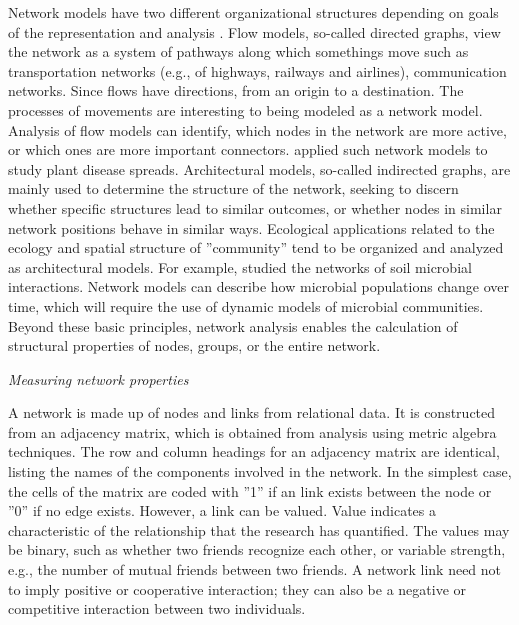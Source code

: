 Network models have two different organizational structures depending on goals of the representation and analysis . Flow models, so-called directed graphs, view the network as a system of pathways along which somethings move such as transportation networks (e.g., of highways, railways and airlines), communication networks. Since flows have directions, from an origin to a destination. The processes of movements  are interesting to being modeled as a network model. Analysis of flow models can identify, which nodes in the network are more active, or which ones are more important connectors.  applied such network models to study plant disease spreads. Architectural models, so-called indirected graphs, are mainly used to determine the structure of the network, seeking to discern whether specific structures lead to similar outcomes, or whether nodes in similar network positions behave in similar ways. Ecological applications related to the ecology and spatial structure of ''community'' tend to be organized and analyzed as architectural models. For example,  studied the networks of soil microbial interactions. Network models can describe how microbial populations change over time, which will require the use of dynamic models of microbial communities. Beyond these basic principles, network analysis enables the calculation of structural properties of nodes, groups, or the entire network.

\textit{Measuring network properties}

A network is made up of nodes and links from relational data. It is constructed from an adjacency matrix, which is obtained from analysis using metric algebra techniques. The row and column headings for an adjacency matrix are identical, listing the names of the components involved in the network. In the simplest case, the cells of the matrix are coded with ''1'' if an link exists between the node or ''0'' if no edge exists. However, a link can be valued. Value indicates a characteristic of the relationship that the research has quantified. The values may be binary, such as whether two friends recognize each other, or variable strength, e.g., the number of mutual friends between two friends. A network link need not to imply positive or cooperative interaction; they can also be a negative or competitive interaction between two individuals.    

